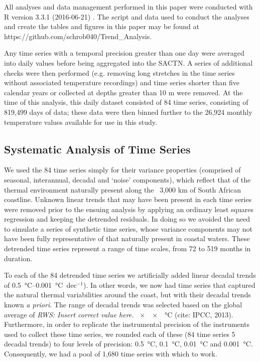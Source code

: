 \documentclass{ametsoc}
\begin{document}
All analyses and data management performed in this paper were conducted with R version 3.3.1 (2016-06-21) \citep{R}. The script and data used to conduct the analyses and create the tables and figures in this paper may be found at https://github.com/schrob040/Trend_Analysis.

Any time series with a temporal precision greater than one day were averaged into daily values before being aggregated into the SACTN. A series of additional checks were then performed (e.g. removing long stretches in the time series without associated temperature recordings) and time series shorter than five calendar years or collected at depths greater than 10 m were removed. At the time of this analysis, this daily dataset consisted of 84 time series, consisting of 819,499 days of data; these data were then binned further to the 26,924 monthly temperature values available for use in this study.

\subsection{Systematic Analysis of Time Series}
We used the 84 time series simply for their variance properties (comprised of seasonal, interannual, decadal and ‘noise’ components), which reflect that of the thermal environment naturally present along the ~3,000 km of South African coastline. Unknown linear trends that may have been present in each time series were removed prior to the ensuing analysis by applying an ordinary least squares regression and keeping the detrended residuals. In doing so we avoided the need to simulate a series of synthetic time series, whose variance components may not have been fully representative of that naturally present in coastal waters. These detrended time series represent a range of time scales, from 72 to 519 months in duration.

To each of the 84 detrended time series we artificially added linear decadal trends of \SIrange{0.5}{0.001}{\degreeCelsius}~dec$^{-1}$). In other words, we now had time series that captured the natural thermal variabilities around the coast, but with their decadal trends known \emph{a priori}. The range of decadal trends was selected based on the global average of \emph{RWS: Insert correct value here.} \SI{xx}{\degreeCelsius} (cite: IPCC, 2013). Furthermore, in order to replicate the instrumental precision of the instruments used to collect these time series, we rounded each of these (84 time series \texttimes{} 5 decadal trends) to four levels of precision: \SI{0.5}{\degreeCelsius}, \SI{0.1}{\degreeCelsius}, \SI{0.01}{\degreeCelsius} and \SI{0.001}{\degreeCelsius}. Consequently, we had a pool of 1,680 time series with which to work.
\end{document}

